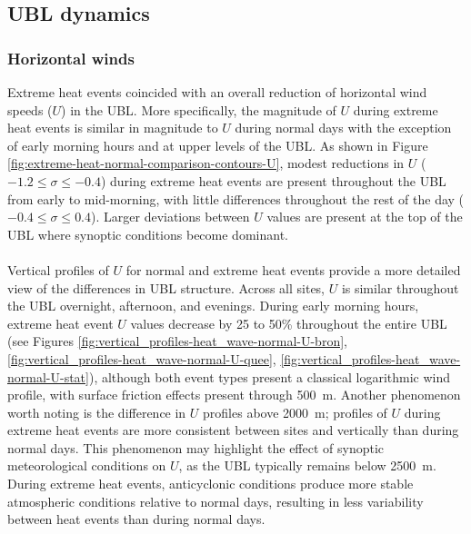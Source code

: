 \documentclass[11pt,a4paper]{article}
\begin{document}
\subsection{UBL dynamics}

\subsubsection{Horizontal winds}
Extreme heat events coincided with an overall reduction of horizontal wind speeds ($U$) in the UBL. More specifically, the magnitude of $U$ during extreme heat events is similar in magnitude to $U$ during normal days with the exception of early morning hours and at upper levels of the UBL. As shown in Figure \ref{fig:extreme-heat-normal-comparison-contours-U}, modest reductions in $U$ ($-1.2 \leq \sigma \leq -0.4$) during extreme heat events are present throughout the UBL from early to mid-morning, with little differences throughout the rest of the day ($-0.4 \leq \sigma \leq 0.4$). Larger deviations between $U$ values are present at the top of the UBL where synoptic conditions become dominant.
\\ \\
Vertical profiles of $U$ for normal and extreme heat events provide a more detailed view of the differences in UBL structure. Across all sites, $U$ is similar throughout the UBL overnight, afternoon, and evenings. During early morning hours, extreme heat event $U$ values decrease by 25 to 50\% throughout the entire UBL (see Figures \ref{fig:vertical_profiles-heat_wave-normal-U-bron}, \ref{fig:vertical_profiles-heat_wave-normal-U-quee}, \ref{fig:vertical_profiles-heat_wave-normal-U-stat}), although both event types present a classical logarithmic wind profile, with surface friction effects present through \SI{500}{\meter}. Another phenomenon worth noting is the difference in $U$ profiles above \SI{2000}{\meter}; profiles of $U$ during extreme heat events are more consistent between sites and vertically than during normal days. This phenomenon may highlight the effect of synoptic meteorological conditions on $U$, as the UBL typically remains below \SI{2500}{\meter}. During extreme heat events, anticyclonic conditions produce more stable atmospheric conditions relative to normal days, resulting in less variability between heat events than during normal days.
\\ \\
\end{document}
